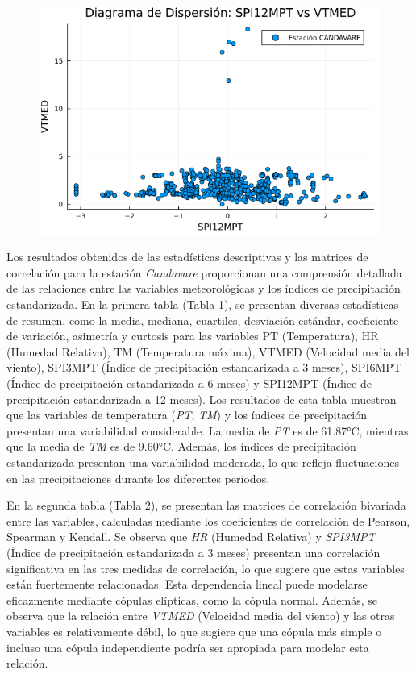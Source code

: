 \begin{figure}[htbp]
\begin{minipage}{0.32\textwidth}
    \includegraphics[width=\linewidth]{Capitulos/Scaterplot/CANDAVARE_SPI12MPT_vs_VTMED.png}
\end{minipage}

\end{figure}

Los resultados obtenidos de las estadísticas descriptivas y las matrices de correlación para la estación \textit{Candavare} proporcionan una comprensión detallada de las relaciones entre las variables meteorológicas y los índices de precipitación estandarizada. En la primera tabla (Tabla 1), se presentan diversas estadísticas de resumen, como la media, mediana, cuartiles, desviación estándar, coeficiente de variación, asimetría y curtosis para las variables PT (Temperatura), HR (Humedad Relativa), TM (Temperatura máxima), VTMED (Velocidad media del viento), SPI3MPT (Índice de precipitación estandarizada a 3 meses), SPI6MPT (Índice de precipitación estandarizada a 6 meses) y SPI12MPT (Índice de precipitación estandarizada a 12 meses). Los resultados de esta tabla muestran que las variables de temperatura (\textit{PT}, \textit{TM}) y los índices de precipitación presentan una variabilidad considerable. La media de \textit{PT} es de 61.87°C, mientras que la media de \textit{TM} es de 9.60°C. Además, los índices de precipitación estandarizada presentan una variabilidad moderada, lo que refleja fluctuaciones en las precipitaciones durante los diferentes periodos.

En la segunda tabla (Tabla 2), se presentan las matrices de correlación bivariada entre las variables, calculadas mediante los coeficientes de correlación de Pearson, Spearman y Kendall. Se observa que \textit{HR} (Humedad Relativa) y \textit{SPI3MPT} (Índice de precipitación estandarizada a 3 meses) presentan una correlación significativa en las tres medidas de correlación, lo que sugiere que estas variables están fuertemente relacionadas. Esta dependencia lineal puede modelarse eficazmente mediante cópulas elípticas, como la cópula normal. Además, se observa que la relación entre \textit{VTMED} (Velocidad media del viento) y las otras variables es relativamente débil, lo que sugiere que una cópula más simple o incluso una cópula independiente podría ser apropiada para modelar esta relación.

